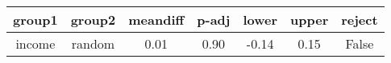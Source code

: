\begin{tabular}{|c|c|c|c|c|c|c|}
\toprule
 group1 &  group2 &  meandiff &  p-adj &  lower &  upper &  reject \\
\midrule
 income &  random &      0.01 &   0.90 &  -0.14 &   0.15 &   False \\
\bottomrule
\end{tabular}
